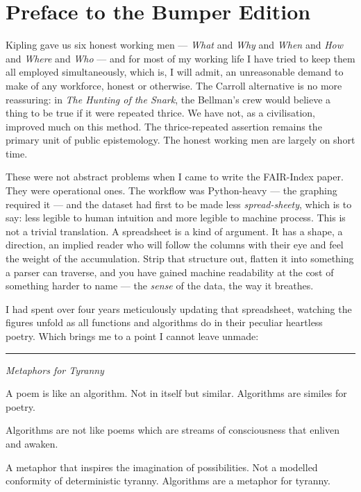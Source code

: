 \section{Preface to the Bumper
Edition}\label{preface-to-the-bumper-edition}

Kipling gave us six honest working men --- \emph{What} and \emph{Why}
and \emph{When} and \emph{How} and \emph{Where} and \emph{Who} --- and
for most of my working life I have tried to keep them all employed
simultaneously, which is, I will admit, an unreasonable demand to make
of any workforce, honest or otherwise. The Carroll alternative is no
more reassuring: in \emph{The Hunting of the Snark}, the Bellman's crew
would believe a thing to be true if it were repeated thrice. We have
not, as a civilisation, improved much on this method. The
thrice-repeated assertion remains the primary unit of public
epistemology. The honest working men are largely on short time.

These were not abstract problems when I came to write the FAIR-Index
paper. They were operational ones. The workflow was Python-heavy --- the
graphing required it --- and the dataset had first to be made less
\emph{spread-sheety}, which is to say: less legible to human intuition
and more legible to machine process. This is not a trivial translation.
A spreadsheet is a kind of argument. It has a shape, a direction, an
implied reader who will follow the columns with their eye and feel the
weight of the accumulation. Strip that structure out, flatten it into
something a parser can traverse, and you have gained machine readability
at the cost of something harder to name --- the \emph{sense} of the
data, the way it breathes.

I had spent over four years meticulously updating that spreadsheet,
watching the figures unfold as all functions and algorithms do in their
peculiar heartless poetry. Which brings me to a point I cannot leave
unmade:

\begin{center}\rule{0.5\linewidth}{0.5pt}\end{center}

\emph{Metaphors for Tyranny}

A poem is like an algorithm. Not in itself but similar. Algorithms are
similes for poetry.

Algorithms are not like poems which are streams of consciousness that
enliven and awaken.

A metaphor that inspires the imagination of possibilities. Not a
modelled conformity of deterministic tyranny. Algorithms are a metaphor
for tyranny.


